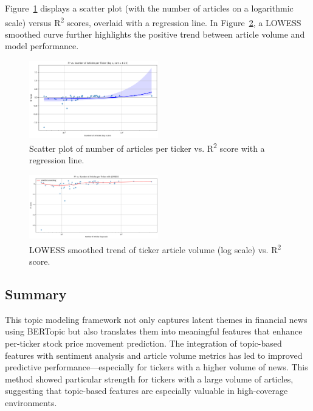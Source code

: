 \documentclass[twocolumn]{article}
\begin{document}
Figure~\ref{fig:article-volume-reg} displays a scatter plot (with the number of articles on a logarithmic scale) versus R\textsuperscript{2} scores, overlaid with a regression line. In Figure~\ref{fig:article-volume-lowess}, a LOWESS smoothed curve further highlights the positive trend between article volume and model performance.

\begin{figure}[h!]
    \centering
    \includegraphics[width=0.5\textwidth]{log_scale_article_mod_performance.png}
    \caption{Scatter plot of number of articles per ticker vs. R\textsuperscript{2} score with a regression line.}
    \label{fig:article-volume-reg}
\end{figure}

\begin{figure}[h!]
    \centering
    \includegraphics[width=0.5\textwidth]{lowess_smoothing.png}
    \caption{LOWESS smoothed trend of ticker article volume (log scale) vs. R\textsuperscript{2} score.}
    \label{fig:article-volume-lowess}
\end{figure}

\subsection{Summary}
This topic modeling framework not only captures latent themes in financial news using BERTopic but also translates them into meaningful features that enhance per-ticker stock price movement prediction. The integration of topic-based features with sentiment analysis and article volume metrics has led to improved predictive performance—especially for tickers with a higher volume of news. This method showed particular strength for tickers with a large volume of articles, suggesting that topic-based features are especially valuable in high-coverage environments.
\end{document}
